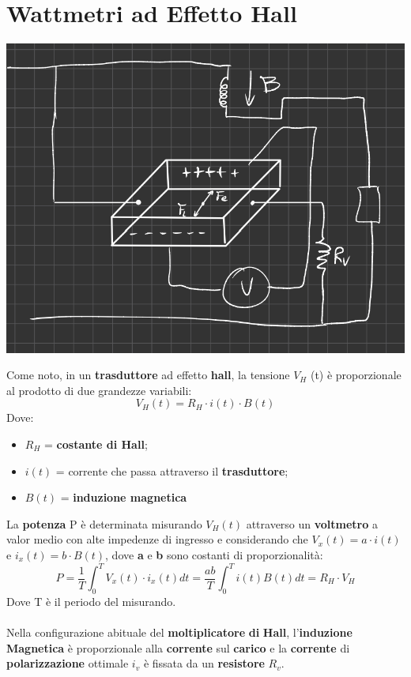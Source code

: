 \section{Wattmetri ad Effetto Hall}
\begin{center}
    \includegraphics[width=.7\textwidth]{Images/figure48.png}
\end{center}
Come noto, in un \textbf{trasduttore} ad effetto \textbf{hall}, la tensione $V_H$ (t) è proporzionale al prodotto di due grandezze variabili:
\begin{equation*}
    V_H (t) = R_H \cdot i(t) \cdot B(t)
\end{equation*}
Dove:
\begin{itemize}
    \item $R_H$ = \textbf{costante di Hall};
    \item $i(t)$ = corrente che passa attraverso il \textbf{trasduttore};
    \item $B(t)$ = \textbf{induzione magnetica}
\end{itemize}
La \textbf{potenza} P è determinata misurando $V_H (t)$ attraverso un \textbf{voltmetro} a valor medio con alte impedenze di ingresso e considerando che $V_x (t) = a \cdot i(t)$ e $i_x (t) = b \cdot B(t)$, dove \textbf{a} e \textbf{b} sono costanti di proporzionalità:
\begin{equation*}
    P = \frac{1}{T} \int_0^T V_x (t) \cdot i_x (t) dt =  \frac{ab}{T} \int_0^T i(t) B(t) dt = R_H \cdot V_H
\end{equation*}
Dove T è il periodo del misurando.\\ \\
Nella configurazione abituale del \textbf{moltiplicatore} \textbf{di} \textbf{Hall}, l'\textbf{induzione} \textbf{Magnetica} è proporzionale alla \textbf{corrente} sul \textbf{carico} e la \textbf{corrente} di \textbf{polarizzazione} ottimale $i_v$ è fissata da un \textbf{resistore} $R_v$.
